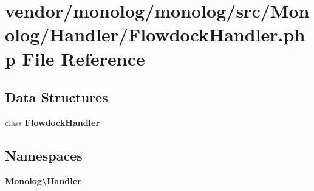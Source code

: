 \section{vendor/monolog/monolog/src/\+Monolog/\+Handler/\+Flowdock\+Handler.php File Reference}
\label{_flowdock_handler_8php}
\subsection*{Data Structures}
\begin{DoxyCompactItemize}
\item 
class {\bf Flowdock\+Handler}
\end{DoxyCompactItemize}
\subsection*{Namespaces}
\begin{DoxyCompactItemize}
\item 
 {\bf Monolog\textbackslash{}\+Handler}
\end{DoxyCompactItemize}
